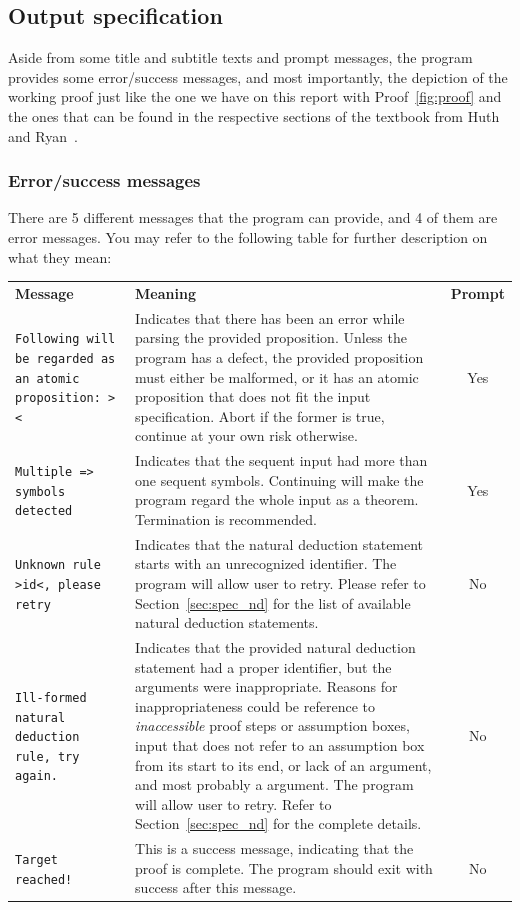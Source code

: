 \documentclass{article}
\begin{document}
\subsection{Output specification}

Aside from some title and subtitle texts and prompt messages, the program
provides some error/success messages, and most importantly, the depiction of the
working proof just like the one we have on this report with Proof~\ref{fig:proof}
and the ones that can be found in the respective sections of the textbook
from Huth and Ryan~\cite{huth2004logic}.

\subsubsection{Error/success messages}

There are 5 different messages that the program can provide, and 4 of them
are error messages. You may refer to the following table for further
description on what they mean:

\begin{center}
	\begin{tabular}{p{12em} p{28em} c}
		\textbf{Message} & \textbf{Meaning} & \textbf{Prompt}\\
		\texttt{Following will be regarded as an atomic proposition: >\AF{}<} &
		Indicates that there has been an error while parsing the provided
		proposition. Unless the program has a defect, the provided proposition
		must either be malformed, or it has an atomic proposition that
		does not fit the input specification. Abort if the former is true,
		continue at your own risk otherwise. &
		Yes\\
		\texttt{Multiple => symbols detected} &
		Indicates that the sequent input had more than one sequent symbols.
		Continuing will make the program regard the whole input as a theorem.
		Termination is recommended. &
		Yes\\
		\texttt{Unknown rule >id<, please retry} &
		Indicates that the natural deduction statement starts with an
		unrecognized identifier. The program will allow user to retry.
		Please refer to Section~\ref{sec:spec_nd} for the list of
		available natural deduction statements. &
		No\\
		\texttt{Ill-formed natural deduction rule, try again.} &
		Indicates that the provided natural deduction statement had a proper
		identifier, but the arguments were inappropriate. Reasons for
		inappropriateness could be reference to \textit{inaccessible}
		proof steps or assumption boxes, \AR{} input that does not refer
		to an assumption box from its start to its end, or lack of an argument,
		and most probably a \AF{} argument. The program will allow user to
		retry. Refer to Section~\ref{sec:spec_nd} for the complete details. &
		No\\
		\texttt{Target reached!} &
		This is a success message, indicating that the proof is complete.
		The program should exit with success after this message.
		&
		No
	\end{tabular}
\end{center}
\end{document}
